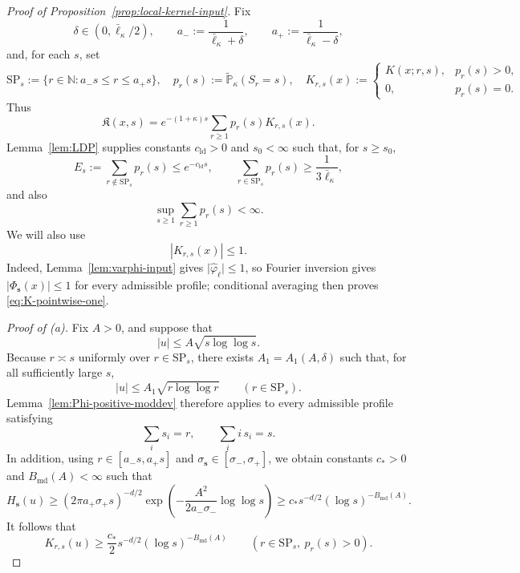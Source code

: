 \documentclass[letterpaper,11pt,reqno]{amsart}
\theoremstyle{definition}
\newcommand{\IK}{\mathfrak{K}}
\begin{document}
\begin{proof}[Proof of Proposition~\ref{prop:local-kernel-input}]
Fix
\[
\delta\in(0,\bar\ell_\kappa/2),\qquad
a_-:=\frac1{\bar\ell_\kappa+\delta},\qquad
a_+:=\frac1{\bar\ell_\kappa-\delta},
\]
and, for each \(s\), set
\[
\mathrm{SP}_s:=\{r\in\mathbb N:a_-s\le r\le a_+s\},\quad
p_r(s):=\tilde{\mathbb P}_\kappa(S_r=s),\quad
K_{r,s}(x):=
\begin{cases}
K(x;r,s),&p_r(s)>0,\\
0,&p_r(s)=0.
\end{cases}
\]
Thus
\begin{equation}\label{eq:local-input-tilt}
\IK(x,s)
=
e^{-(1+\kappa)s}\sum_{r\ge1}p_r(s)K_{r,s}(x).
\end{equation}
Lemma~\ref{lem:LDP} supplies constants \(c_{\mathrm{ld}}>0\) and \(s_0<\infty\) such that,
for \(s\ge s_0\),
\begin{equation}\label{eq:local-input-renewal}
E_s:=\sum_{r\notin\mathrm{SP}_s}p_r(s)\le e^{-c_{\mathrm{ld}}s},
\qquad
\sum_{r\in\mathrm{SP}_s}p_r(s)\ge\frac1{3\bar\ell_\kappa},
\end{equation}
and also
\begin{equation}\label{eq:local-input-renewal-upper}
\sup_{s\ge1}\sum_{r\ge1}p_r(s)<\infty.
\end{equation}
We will also use
\begin{equation}\label{eq:K-pointwise-one}
|K_{r,s}(x)|\le1.
\end{equation}
Indeed, Lemma~\ref{lem:varphi-input} gives
\(\lvert\widehat\varphi_\ell\rvert\le1\), so Fourier inversion gives
\(\lvert\Phi_{\mathbf s}(x)\rvert\le1\) for every admissible profile; conditional averaging
then proves \eqref{eq:K-pointwise-one}.

\smallskip
\noindent\textit{Proof of {\rm(a)}.}
Fix \(A>0\), and suppose that
\[
|u|\le A\sqrt{s\log\log s}.
\]
Because \(r\asymp s\) uniformly over \(r\in\mathrm{SP}_s\), there exists
\(A_1=A_1(A,\delta)\) such that, for all sufficiently large \(s\),
\[
|u|\le A_1\sqrt{r\log\log r}
\qquad (r\in\mathrm{SP}_s).
\]
Lemma~\ref{lem:Phi-positive-moddev} therefore applies to every admissible profile satisfying
\[
\sum_i s_i=r,\qquad \sum_i i\,s_i=s.
\]
In addition, using \(r\in[a_-s,a_+s]\) and
\(\sigma_{\mathbf s}\in[\sigma_-,\sigma_+]\), we obtain constants \(c_*>0\) and
\(B_{\mathrm{md}}(A)<\infty\) such that
\[
H_{\mathbf s}(u)
\ge
(2\pi a_+\sigma_+s)^{-d/2}
\exp\!\left(-\frac{A^2}{2a_-\sigma_-}\log\log s\right)
\ge
c_*s^{-d/2}(\log s)^{-B_{\mathrm{md}}(A)}.
\]
It follows that
\begin{equation}\label{eq:typical-K-lower}
K_{r,s}(u)
\ge
\frac{c_*}{2}s^{-d/2}(\log s)^{-B_{\mathrm{md}}(A)}
\qquad (r\in\mathrm{SP}_s,\ p_r(s)>0).
\end{equation}


\end{proof}
\end{document}
